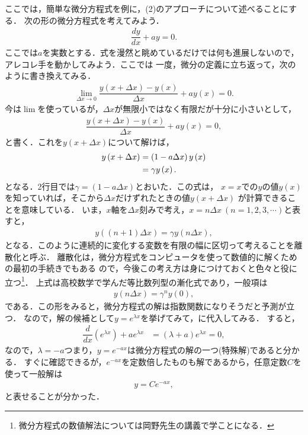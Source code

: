 ここでは，簡単な微分方程式を例に，(2)のアプローチについて述べることにする．
次の形の微分方程式を考えてみよう．
\begin{align}
  \dfrac{dy}{dx} + a y = 0. \label{eq:example_prediction}
\end{align}
ここでは$a$を実数とする．式を漫然と眺めているだけでは何も進展しないので，アレコレ手を動かしてみよう．ここでは
一度，微分の定義に立ち返って，次のように書き換えてみる．
\begin{align}
  \lim_{\Delta x \to 0} \dfrac{y\left(x+\Delta x\right) - y\left(x\right)}{\Delta x} + ay\left(x\right) = 0. 
\end{align}
今は$\lim$を使っているが，$\Delta x$が無限小ではなく有限だが十分に小さいとして，
\begin{align}
 \dfrac{y\left(x+\Delta x\right) - y\left(x\right)}{\Delta x} + ay\left(x\right) = 0,
\end{align}
と書く．これを$y\left(x+\Delta x\right)$について解けば，
\begin{align}
 y\left(x+\Delta x\right) &= \left(1-a\Delta x\right) y\left(x\right) \notag \\
                          &= \gamma y\left(x\right).
\end{align}
となる．2行目では$\gamma = \left(1-a\Delta x\right)$とおいた．この式は，
$x=x$での$y$の値$y(x)$を知っていれば，そこから$\Delta x$だけずれたときの値$y\left(x+\Delta x\right)$
が計算できることを意味している．
いま，$x$軸を$\Delta x$刻みで考え，$x = n\Delta x~(n=1,2,3,\cdots)$と表すと，
\begin{align}
  y\left((n+1)\Delta x\right) = \gamma y\left(n\Delta x\right), 
\end{align}
となる．このように連続的に変化する変数を有限の幅に区切って考えることを離散化と呼ぶ．
離散化は，微分方程式をコンピュータを使って数値的に解くための最初の手続きでもある
ので，今後この考え方は身につけておくと色々と役に立つ\footnote{微分方程式の数値解法については岡野先生の講義で学ことになる．}．
上式は高校数学で学んだ等比数列型の漸化式であり，一般項は
\begin{align}
  y\left(n\Delta x\right) = \gamma^{n}y\left(0\right), 
\end{align}
である．この形をみると，微分方程式の解は指数関数になりそうだと予測が立つ．
なので，解の候補として$y=e^{\lambda x}$を挙げてみて，に代入してみる．
すると，
\begin{align}
  \dfrac{d}{dx}\left(e^{\lambda x}\right)+ae^{\lambda x} & =\left(\lambda+a\right)e^{\lambda x}=0,
\end{align}
なので，$\lambda=-a$つまり，$y=e^{-ax}$は微分方程式の解の一つ(特殊解)であると分かる．
すぐに確認できるが，$e^{-ax}$を定数倍したものも解であるから，任意定数$C$を使って一般解は
\begin{align}
  y = Ce^{-ax},
\end{align}
と表せることが分かった．

